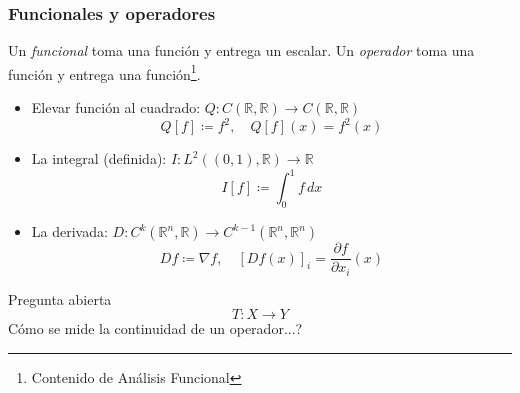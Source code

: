 \documentclass[12pt,aspectratio=169,xcolor=dvipsnames]{beamer}
\newcommand{\R}{\mathbb{R}}
\begin{document}
\begin{frame}\frametitle{Funcionales y operadores}
    Un \emph{funcional} toma una función y entrega un escalar. Un \emph{operador} toma una función y entrega una función\footnote{Contenido de Análisis Funcional}.  \pause

    \begin{itemize}
        \item<+-> Elevar función al cuadrado: $Q: C(\R, \R) \to C(\R, \R)$
            $$ Q[f] \coloneqq f^2, \quad Q[f](x) = f^2(x) $$
        \item<+-> La integral (definida): $I: L^2((0,1), \R) \to \R$
            $$ I[f] \coloneqq \int_0^1 f\,dx $$
        \item<+-> La derivada: $D: C^k(\R^n, \R) \to C^{k-1}(\R^n, \R^n)$
            $$ Df \coloneqq \nabla f, \quad [Df(x)]_i = \frac{\partial f}{\partial x_i}(x) $$
    \end{itemize}
\end{frame}
\begin{frame}{Pregunta abierta}
        $$ T:X\to Y $$
    Cómo se mide la continuidad de un operador...?
\end{frame}
\begin{frame}
    \maketitle
\end{frame}
\end{document}
